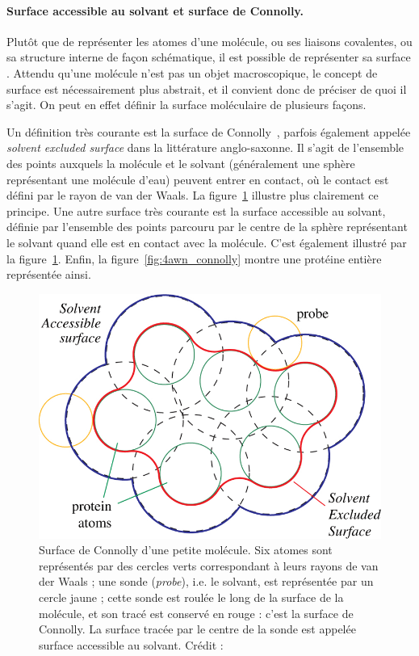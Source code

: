		
	\paragraph{Surface accessible au solvant et surface de Connolly.} Plutôt que de représenter les atomes d'une molécule, ou ses liaisons covalentes, ou sa structure interne de façon schématique, il est possible de représenter sa \og surface \fg{}. Attendu qu'une molécule n'est pas un objet macroscopique, le concept de surface est nécessairement plus abstrait, et il convient donc de préciser de quoi il s'agit. On peut en effet définir la surface moléculaire de plusieurs façons.
		
	Un définition très courante est la surface de Connolly~\cite{connolly1983analytical}, parfois également appelée \emph{solvent excluded surface} dans la littérature anglo-saxonne. Il s'agit de l'ensemble des points auxquels la molécule et \og le solvant \fg{} (généralement une sphère représentant une molécule d'eau) peuvent entrer en contact, où le contact est défini par le rayon de van der Waals. La figure~\ref{fig:connolly} illustre plus clairement ce principe. Une autre surface très courante est la surface accessible au solvant, définie par l'ensemble des points parcouru par le centre de la sphère représentant le solvant quand elle est en contact avec la molécule. C'est également illustré par la figure~\ref{fig:connolly}. Enfin, la figure~\ref{fig:4awn_connolly} montre une protéine entière représentée ainsi.
		
	\begin{figure}[H]
		\centering
		\includegraphics[width=\textwidth]{figures/ch1/connolly}
		\caption{Surface de Connolly d'une petite molécule. Six atomes sont représentés par des cercles verts correspondant à leurs rayons de van der Waals ; une sonde (\emph{probe}), i.e. le solvant, est représentée par un cercle jaune ; cette sonde est \og roulée \fg{} le long de la surface de la molécule, et son tracé est conservé en rouge : c'est la surface de Connolly. La surface tracée par le centre de la sonde est appelée surface accessible au solvant. Crédit :~\cite{krone2009interactive}}
		\label{fig:connolly}
	\end{figure}
		
